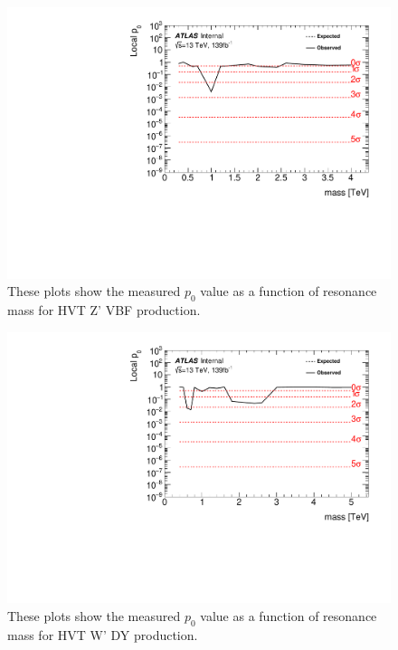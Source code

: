 \begin{figure}[h!]
  \centering
  \includegraphics[width=\hsize]{figures/results/pvalues/fixed_pvalues/hvtwwvbf_pvalue.pdf}
 \caption{These plots show the measured $p_{0}$ value as a function of resonance mass for HVT Z' VBF production.} 
  \label{fig:discov_hvtwwvbf}
\end{figure} 
\FloatBarrier


\begin{figure}[h!]
  \centering
  \includegraphics[width=\hsize]{figures/results/pvalues/fixed_pvalues/hvtwz_pvalue.pdf}
 \caption{These plots show the measured $p_{0}$ value as a function of resonance mass for HVT W' DY production.} 
  \label{fig:discov_hvtwz}
\end{figure} 
\FloatBarrier

